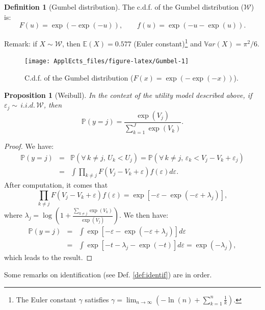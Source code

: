 \documentclass[
  12pt,
]{book}
\newtheorem{proposition}{Proposition}[chapter]
\theoremstyle{definition}
\newtheorem{definition}{Definition}[chapter]
\theoremstyle{definition}
\theoremstyle{definition}
\theoremstyle{definition}
\theoremstyle{remark}
\begin{document}
\begin{definition}[Gumbel distribution]
\protect\hypertarget{def:Gumbel}{}\label{def:Gumbel}The c.d.f. of the Gumbel distribution (\(\mathcal{W}\)) is:
\[
F(u) = \exp(-\exp(-u)), \qquad f(u)=\exp(-u-\exp(u)).
\]
\end{definition}

Remark: if \(X\sim\mathcal{W}\), then \(\mathbb{E}(X)=0.577\) (Euler constant)\footnote{The Euler constant \(\gamma\) satisfies \(\gamma = \lim_{n\rightarrow \infty} \left(- \ln(n) + \sum_{k=1}^n \frac{1}{k}\right)\).} and \(\mathbb{V}ar(X)=\pi^2/6\).

\begin{figure}
\texttt{[image: ApplEcts\_files/figure-latex/Gumbel-1]} \caption{C.d.f. of the Gumbel distribution ($F(x)=\exp(-\exp(-x))$).}\label{fig:Gumbel}
\end{figure}

\begin{proposition}[Weibull]
\protect\hypertarget{prp:Weibull}{}\label{prp:Weibull}In the context of the utility model described above, if \(\varepsilon_j \sim \,i.i.d.\,\mathcal{W}\), then
\[
\mathbb{P}(y=j) = \frac{\exp(V_j)}{\sum_{k=1}^J \exp(V_k)}.
\]
\end{proposition}

\begin{proof}
We have:
\begin{eqnarray*}
\mathbb{P}(y=j) &=& \mathbb{P}(\forall\,k \ne j,\,U_k < U_j) =  \mathbb{P}(\forall\,k \ne j,\,\varepsilon_k < V_j - V_k + \varepsilon_j) \\
&=& \int \prod_{k \ne j} F(V_j - V_k + \varepsilon) f(\varepsilon)d\varepsilon.
\end{eqnarray*}
After computation, it comes that
\[
\prod_{k \ne j} F(V_j - V_k + \varepsilon) f(\varepsilon) = \exp\left[-\varepsilon-\exp(-\varepsilon+\lambda_j)\right],
\]
where \(\lambda_j = \log\left(1 + \frac{\sum_{k \ne j} \exp(V_k)}{\exp(V_j)}\right)\). We then have:
\begin{eqnarray*}
\mathbb{P}(y=j) &=& \int  \exp\left[-\varepsilon-\exp(-\varepsilon+\lambda_j)\right] d\varepsilon\\
&=& \int  \exp\left[-t - \lambda_j-\exp(-t)\right] d\varepsilon = \exp(- \lambda_j),
\end{eqnarray*}
which leads to the result.
\end{proof}

Some remarks on identification (see Def. \ref{def:identif}) are in order.
\end{document}
